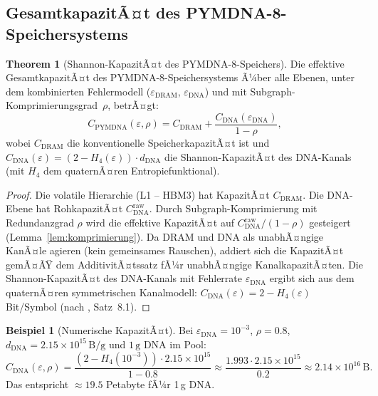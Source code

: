 ﻿\documentclass[a4paper,12pt]{article}
\theoremstyle{definition}
\newtheorem{beispiel}{Beispiel}[section]
\newtheorem{theorem}{Theorem}[section]
\begin{document}
\subsection{GesamtkapazitÃ¤t des PYMDNA-8-Speichersystems}

\begin{theorem}[Shannon-KapazitÃ¤t des PYMDNA-8-Speichers]
  \label{thm:kapazitaet}
  Die effektive GesamtkapazitÃ¤t des PYMDNA-8-Speichersystems Ã¼ber alle
  Ebenen, unter dem kombinierten Fehlermodell ($\varepsilon_{\mathrm{DRAM}}$,
  $\varepsilon_{\mathrm{DNA}}$) und mit Subgraph-Komprimierungsgrad~$\rho$, betrÃ¤gt:
  \begin{equation}
    C_{\mathrm{PYMDNA}}(\varepsilon, \rho)
    = C_{\mathrm{DRAM}} + \frac{C_{\mathrm{DNA}}(\varepsilon_{\mathrm{DNA}})}{1 - \rho},
    \label{eq:kapazitaet}
  \end{equation}
  wobei $C_{\mathrm{DRAM}}$ die konventionelle SpeicherkapazitÃ¤t ist und
  $C_{\mathrm{DNA}}(\varepsilon) = (2 - H_4(\varepsilon)) \cdot d_{\mathrm{DNA}}$
  die Shannon-KapazitÃ¤t des DNA-Kanals (mit $H_4$ dem quaternÃ¤ren Entropiefunktional).
\end{theorem}

\begin{proof}
  Die volatile Hierarchie (L1 -- HBM3) hat KapazitÃ¤t $C_{\mathrm{DRAM}}$.
  Die DNA-Ebene hat RohkapazitÃ¤t $C_{\mathrm{DNA}}^{\mathrm{raw}}$.
  Durch Subgraph-Komprimierung mit Redundanzgrad $\rho$ wird die effektive
  KapazitÃ¤t auf $C_{\mathrm{DNA}}^{\mathrm{raw}} / (1-\rho)$ gesteigert
  (Lemma~\ref{lem:komprimierung}).
  Da DRAM und DNA als unabhÃ¤ngige KanÃ¤le agieren (kein gemeinsames Rauschen),
  addiert sich die KapazitÃ¤t gemÃ¤ÃŸ dem AdditivitÃ¤tssatz fÃ¼r unabhÃ¤ngige
  KanalkapazitÃ¤ten.
  Die Shannon-KapazitÃ¤t des DNA-Kanals mit Fehlerrate $\varepsilon_{\mathrm{DNA}}$
  ergibt sich aus dem quaternÃ¤ren symmetrischen Kanalmodell:
  $C_{\mathrm{DNA}}(\varepsilon) = 2 - H_4(\varepsilon)$ Bit/Symbol
  (nach \cite{epp2026dnastor}, Satz~8.1).
\end{proof}

\begin{beispiel}[Numerische KapazitÃ¤t]
  Bei $\varepsilon_{\mathrm{DNA}} = 10^{-3}$, $\rho = 0.8$,
  $d_{\mathrm{DNA}} = 2.15 \times 10^{15}\,\mathrm{B/g}$ und
  $1\,\mathrm{g}$ DNA im Pool:
  \[
    C_{\mathrm{DNA}}(\varepsilon, \rho)
    = \frac{(2 - H_4(10^{-3})) \cdot 2.15 \times 10^{15}}{1 - 0.8}
    \approx \frac{1.993 \cdot 2.15 \times 10^{15}}{0.2}
    \approx 2.14 \times 10^{16}\,\mathrm{B}.
  \]
  Das entspricht $\approx 19.5$ Petabyte fÃ¼r 1\,g DNA.
\end{beispiel}
\end{document}
